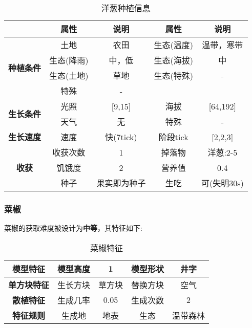 \begin{table}[H]
    \centering
    \caption{洋葱种植信息}
    \label{table:洋葱种植信息}
    \setlength{\tabcolsep}{4mm}
    \begin{tabular}{c|cc|cc}
        \toprule
                                           & \textbf{属性} & \textbf{说明} & \textbf{属性} & \textbf{说明} \\
        \midrule
        \multirow{4}{*}{\textbf{种植条件}} & 土地          & 农田          & 生态(温度)    & 温带，寒带    \\
                                           & 生态(降雨)    & 中，低        & 生态(海拔)    & 中            \\
                                           & 生态(土地)    & 草地          & 生态(特殊)    & -             \\
                                           & 特殊          & -                                             \\
        \midrule
        \multirow{2}{*}{\textbf{生长条件}} & 光照          & [9,15]        & 海拔          & [64,192]      \\
                                           & 天气          & 无            & 特殊          & -             \\
        \midrule
        \textbf{生长速度}                  & 速度          & 快(7tick)     & 阶段tick      & [2,2,3]       \\
        \midrule
        \multirow{3}{*}{\textbf{收获}}     & 收获次数      & 1             & 掉落物        & 洋葱:2-5      \\
                                           & 饥饿度        & 2             & 营养值        & 0.4           \\
                                           & 种子          & 果实即为种子  & 生吃          & 可(失明30s)   \\
        \bottomrule
    \end{tabular}
\end{table}

\subsubsection{菜椒}

菜椒的获取难度被设计为\textbf{中等}，其特征如下:
\begin{table}[H]
    \centering
    \caption{菜椒特征}
    \label{table:菜椒特征}
    \setlength{\tabcolsep}{4mm}
    \begin{tabular}{c|cc|cc}
        \toprule
        \textbf{模型特征}   & 模型高度 & 1      & 模型形状 & 井字     \\
        \midrule
        \textbf{单方块特征} & 生长方块 & 草方块 & 替换方块 & 空气     \\
        \midrule
        \textbf{散植特征}   & 生成几率 & 0.05   & 生成次数 & 2        \\
        \midrule
        \textbf{特征规则}   & 生成地   & 地表   & 生态     & 温带森林 \\
        \bottomrule
    \end{tabular}
\end{table}


